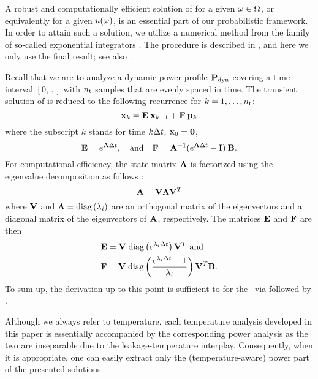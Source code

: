 A robust and computationally efficient solution of  for a given $\omega \in \Omega$, or equivalently for a given $u(\omega)$, is an essential part of our probabilistic framework.
In order to attain such a solution, we utilize a numerical method from the family of so-called exponential integrators \cite{hochbruck2010}.
The procedure is described in , and here we only use the final result; see also \cite{ukhov2012}.

Recall that we are to analyze a dynamic power profile $\mathbf{P}_{\text{dyn}}$ covering a time interval $[0, \period]$ with ${n_\text{t}}$ samples that are evenly spaced in time.
The transient solution of  is reduced to the following recurrence for $k = 1, \dots, {n_\text{t}}$:
\begin{equation} \elabel{recurrence}
  \vX_k = \mE \: \vX_{k - 1} + \mF \: \vP_k
\end{equation}
where the subscript $k$ stands for time $k \Delta t$, $\mathbf{x}_0 = \mathbf{0}$,
\[
  \mathbf{E} = e^{\mathbf{A} \Delta t}, \hspace{1em} \text{and} \hspace{1em} \mathbf{F} = \mathbf{A}^{-1} (e^{\mathbf{A} \Delta t} - \mathbf{I}) \: \mathbf{B}.
\]
For computational efficiency, the state matrix $\mathbf{A}$ is factorized using the eigenvalue decomposition as follows \cite{press2007}:
\begin{equation} \elabel{eigenvalue-decomposition}
  \mA = \mV \mL \mV^T
\end{equation}
where $\mathbf{V}$ and $\mathbf{\Lambda} = \text{diag}\left( \lambda_i \right)$ are an orthogonal matrix of the eigenvectors and a diagonal matrix of the eigenvectors of $\mathbf{A}$, respectively.
The matrices $\mathbf{E}$ and $\mathbf{F}$ are then
\begin{align*}
  & \mathbf{E} = \mathbf{V} \; \text{diag}\left( e^{\lambda_i \Delta t} \right) \mathbf{V}^T \text{ and} \\
  & \mathbf{F} = \mathbf{V} \; \text{diag}\left(  \frac{e^{\lambda_i \Delta t} - 1}{\lambda_i}  \right) \mathbf{V}^T \mathbf{B}.
\end{align*}
To sum up, the derivation up to this point is sufficient to for the \tta\ via  followed by .
\begin{remark}
Although we always refer to temperature, each temperature analysis developed in this paper is essentially accompanied by the corresponding power analysis as the two are inseparable due to the leakage-temperature interplay.
Consequently, when it is appropriate, one can easily extract only the (temperature-aware) power part of the presented solutions.
\end{remark}

